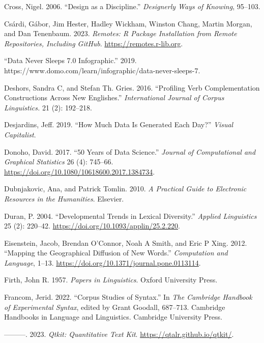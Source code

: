 \documentclass[
  letterpaper,
]{latex/krantz}
\newlength{\cslhangindent}
\newenvironment{CSLReferences}[2] %
 {\begin{list}{}{%
  \setlength{\itemindent}{0pt}
  \setlength{\leftmargin}{0pt}
  \setlength{\parsep}{0pt}
  \ifodd #1
   \setlength{\leftmargin}{\cslhangindent}
   \setlength{\itemindent}{-1\cslhangindent}
  \fi
  \setlength{\itemsep}{#2\baselineskip}}}
 {\end{list}}
\theoremstyle{definition}
\theoremstyle{remark}
\begin{document}
\begin{CSLReferences}{1}{0}
Cross, Nigel. 2006. {``Design as a Discipline.''} \emph{Designerly Ways
of Knowing}, 95--103.

Csárdi, Gábor, Jim Hester, Hadley Wickham, Winston Chang, Martin Morgan,
and Dan Tenenbaum. 2023. \emph{Remotes: R Package Installation from
Remote Repositories, Including GitHub}. \url{https://remotes.r-lib.org}.

{``Data Never Sleeps 7.0 Infographic.''} 2019.
https://www.domo.com/learn/infographic/data-never-sleeps-7.

Deshors, Sandra C, and Stefan Th. Gries. 2016. {``Profiling Verb
Complementation Constructions Across New Englishes.''}
\emph{International Journal of Corpus Linguistics.} 21 (2): 192--218.

Desjardins, Jeff. 2019. {``How Much Data Is Generated Each Day?''}
\emph{Visual Capitalist}.

Donoho, David. 2017. {``50 Years of Data Science.''} \emph{Journal of
Computational and Graphical Statistics} 26 (4): 745--66.
\url{https://doi.org/10.1080/10618600.2017.1384734}.

Dubnjakovic, Ana, and Patrick Tomlin. 2010. \emph{A Practical Guide to
Electronic Resources in the Humanities}. Elsevier.

Duran, P. 2004. {``Developmental Trends in Lexical Diversity.''}
\emph{Applied Linguistics} 25 (2): 220--42.
\url{https://doi.org/10.1093/applin/25.2.220}.

Eisenstein, Jacob, Brendan O'Connor, Noah A Smith, and Eric P Xing.
2012. {``Mapping the Geographical Diffusion of New Words.''}
\emph{Computation and Language}, 1--13.
\url{https://doi.org/10.1371/journal.pone.0113114}.

Firth, John R. 1957. \emph{Papers in Linguistics}. Oxford University
Press.

Francom, Jerid. 2022. {``Corpus Studies of Syntax.''} In \emph{The
Cambridge Handbook of Experimental Syntax}, edited by Grant Goodall,
687--713. Cambridge Handbooks in Language and Linguistics. Cambridge
University Press.

---------. 2023. \emph{Qtkit: Quantitative Text Kit}.
\url{https://qtalr.github.io/qtkit/}.


\end{CSLReferences}
\end{document}
